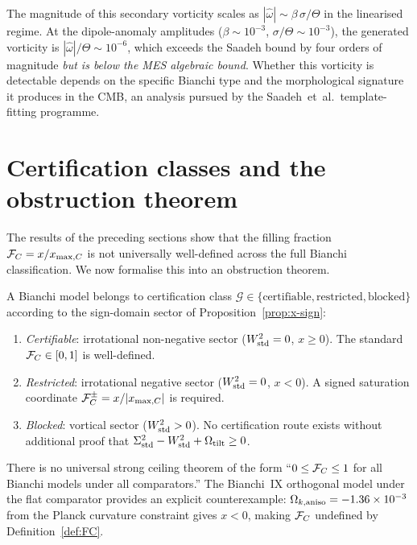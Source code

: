 The magnitude of this secondary vorticity scales as
$|\hat{\omega}| \sim \beta\,\sigma/\Theta$ in the linearised
regime.  At the dipole-anomaly amplitudes
($\beta \sim 10^{-3}$, $\sigma/\Theta \sim 10^{-3}$),
the generated vorticity is $|\hat{\omega}|/\Theta \sim 10^{-6}$,
which exceeds the Saadeh bound by four orders of magnitude
\emph{but is below the MES algebraic bound}.  Whether this
vorticity is detectable depends on the specific Bianchi type and
the morphological signature it produces in the CMB, an analysis
pursued by the Saadeh~et~al.\ template-fitting programme.


\section{Certification classes and the obstruction theorem}
\label{sec:certification}

The results of the preceding sections show that the
filling fraction $\mathcal{F}_C = x/x_{\max,C}$ is not universally
well-defined across the full Bianchi classification.  We now
formalise this into an obstruction theorem.

\begin{definition}
\label{def:cert-class}
A Bianchi model belongs to certification class
$\mathcal{G} \in \{\text{certifiable}, \text{restricted},
\text{blocked}\}$ according to the sign-domain sector of
Proposition~\ref{prop:x-sign}:
\begin{enumerate}
\item \emph{Certifiable}: irrotational non-negative sector
  ($W^2_{\mathrm{std}} = 0$, $x \geq 0$).  The standard $\mathcal{F}_C \in [0,1]$
  is well-defined.
\item \emph{Restricted}: irrotational negative sector
  ($W^2_{\mathrm{std}} = 0$, $x < 0$).  A signed saturation coordinate
  $\mathcal{F}_C^{\pm} = x/|x_{\max,C}|$ is required.
\item \emph{Blocked}: vortical sector ($W^2_{\mathrm{std}} > 0$).
  No certification route exists without additional
  proof that $\Sigma^2_{\mathrm{std}} - W^2_{\mathrm{std}} + \Omega_{\mathrm{tilt}} \geq 0$.
\end{enumerate}
\end{definition}

\begin{proposition}
\label{prop:obstruction}
There is no universal strong ceiling theorem of the form
``$0 \leq \mathcal{F}_C \leq 1$ for all Bianchi models under all
comparators.''  The Bianchi~IX orthogonal model under the
flat comparator provides an explicit counterexample:
$\Omega_{k,\mathrm{aniso}} = -1.36 \times 10^{-3}$ from the Planck curvature
constraint gives $x < 0$, making $\mathcal{F}_C$ undefined by
Definition~\ref{def:FC}.
\end{proposition}

